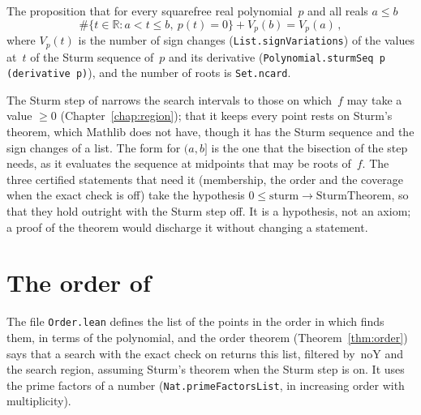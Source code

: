\begin{definition}\label{def:sturmTheorem}
  \leanok
  The proposition that for every squarefree real polynomial~$p$ and all reals $a \le b$
  \[
    \#\{t \in \mathbb{R} : a < t \le b,\ p(t) = 0\} + V_p(b) = V_p(a)\,,
  \]
  where $V_p(t)$ is the number of sign changes (\verb|List.signVariations|) of the values at~$t$ of
  the Sturm sequence of~$p$ and its derivative (\verb|Polynomial.sturmSeq p (derivative p)|), and
  the number of roots is \verb|Set.ncard|.
\end{definition}

The Sturm step of \ratpoints{} narrows the search intervals to those on which~$f$ may take a value
$\ge 0$ (Chapter~\ref{chap:region}); that it keeps every point rests on Sturm's theorem, which
Mathlib does not have, though it has the Sturm sequence and the sign changes of a list. The form for
$(a, b]$ is the one that the bisection of the step needs, as it evaluates the sequence at midpoints
that may be roots of~$f$. The three certified statements that need it (membership, the order and the
coverage when the exact check is off) take the hypothesis $0 \le \mathrm{sturm} \to
\mathrm{SturmTheorem}$, so that they hold outright with the Sturm step off. It is a hypothesis, not
an axiom; a proof of the theorem would discharge it without changing a statement.

\section{The order of \ratpoints{}}\label{sec:specOrder}

The file \verb|Order.lean| defines the list of the points in the order in which \ratpoints{} finds
them, in terms of the polynomial, and the order theorem (Theorem~\ref{thm:order}) says that a search
with the exact check on returns this list, filtered by~$\mathrm{noY}$ and the search region,
assuming Sturm's theorem when the Sturm step is on. It uses the prime factors of a number
(\verb|Nat.primeFactorsList|, in increasing order with multiplicity).

